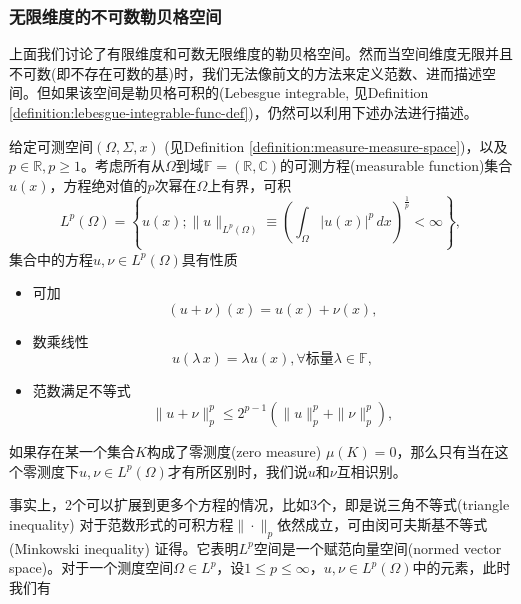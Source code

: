 \subsubsection{无限维度的不可数勒贝格空间}
\label{sec:lp-spaces-banach}
上面我们讨论了有限维度和可数无限维度的勒贝格空间。然而当空间维度无限并且不可数(即不存在可数的基)时，我们无法像前文的方法来定义范数、进而描述空间。但如果该空间是勒贝格可积的(Lebesgue integrable, 见Definition \ref{definition:lebesgue-integrable-func-def})，仍然可以利用下述办法进行描述。

  给定可测空间$(\Omega,\Sigma,x)$ (见Definition \ref{definition:measure-measure-space})，以及$p \in \mathbb{R}, p \ge 1$。考虑所有从$\Omega$到域$\mathbb{F}=\left(\mathbb{R},\mathbb{C} \right)$的可测方程(measurable function)集合$u(x)$，方程绝对值的$p$次幂在$\Omega$上有界，可积
  \begin{equation*}
    L^p(\Omega) = \left\{u(x);  \| u \|_{L^p(\Omega)} \equiv \left( \int_{\Omega} |u(x)|^p \, d x \right)^{\frac{1}{p}} < \infty \right\},
  \end{equation*}
  集合中的方程$u,\nu \in L^p(\Omega)$具有性质
\begin{itemize}
  \item 可加
  \begin{equation*}
    (u+\nu)(x) = u(x) + \nu(x),
  \end{equation*}
  \item 数乘线性
  \begin{equation*}
    u(\lambda \, x) = \lambda u(x), \forall \text{标量} \lambda \in \mathbb{F},
  \end{equation*}
  \item 范数满足不等式
  \begin{equation*}
    \| u + \nu \|_p^p \le 2^{p-1} \left( \| u \|_{p}^{p} + \| \nu \|_{p}^{p} \right),
  \end{equation*}

\end{itemize}
  如果存在某一个集合$K$构成了零测度(zero measure) $\mu(K) = 0$，那么只有当在这个零测度下$u,\nu \in L^p(\Omega)$才有所区别时，我们说$u$和$\nu$互相识别。

  事实上，2个可以扩展到更多个方程的情况，比如3个，即是说三角不等式(triangle inequality) 对于范数形式的可积方程$\| \cdot \|_{p}$依然成立，可由闵可夫斯基不等式(Minkowski inequality) 证得。它表明$L^p$空间是一个赋范向量空间(normed vector space)。对于一个测度空间$\Omega \in L^{p}$，设$1 \le p \le \infty$，$u, \nu \in L^{p}(\Omega)$中的元素，此时我们有

